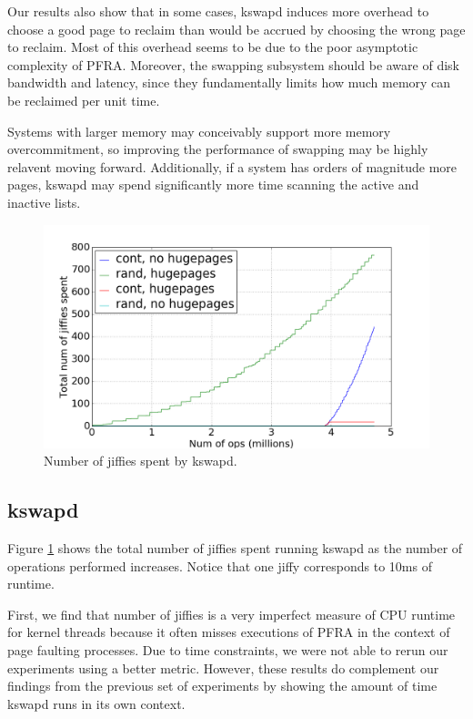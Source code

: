 \documentclass[twocolumn,11pt]{article}
\begin{document}
Our results also show that in some cases, kswapd induces more overhead to choose
a good page to reclaim than would be accrued by choosing the wrong page to
reclaim. Most of this overhead seems to be due to the poor asymptotic complexity
of PFRA. Moreover, the swapping subsystem should be aware of disk bandwidth and
latency, since they fundamentally limits how much memory can be reclaimed per
unit time.

Systems with larger memory may conceivably support more memory overcommitment,
so improving the performance of swapping may be highly relavent moving forward.
Additionally, if a system has orders of magnitude more pages, kswapd may spend
significantly more time scanning the active and inactive lists.


\begin{figure}[t]
    \includegraphics[width=\columnwidth]{figures/kswapd_jiffies}
    \caption{Number of jiffies spent by kswapd.\label{fig:kswapd_jiffies}}
\end{figure}

\subsection{kswapd}

Figure \ref{fig:kswapd_jiffies} shows the total number of jiffies spent running kswapd as the
number of operations performed increases. Notice that one jiffy corresponds to
10ms of runtime.

First, we find that number of jiffies is a very imperfect measure of CPU runtime
for kernel threads because it often misses executions of PFRA in the context of
page faulting processes. Due to time constraints, we were not able to rerun our
experiments using a better metric. However, these results do complement our
findings from the previous set of experiments by showing the amount of time
kswapd runs in its own context.
\end{document}
